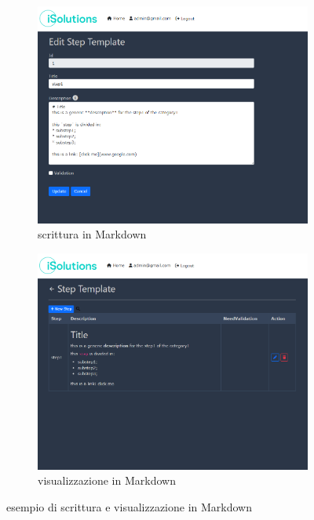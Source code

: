 \begin{figure}[H]
	\centering
	\begin{subfigure}{0.3\textwidth}
		\includegraphics[width=\textwidth]{img/markdown_p1.png}
		\caption{scrittura in Markdown}
	\end{subfigure}%
	\begin{subfigure}{0.3\textwidth}
		\includegraphics[width=\textwidth]{img/markdown_pt2.png}
		\caption{visualizzazione in Markdown}
	\end{subfigure}
	\caption{esempio di scrittura e visualizzazione in Markdown}
	\label{fig:markdown}
\end{figure}

